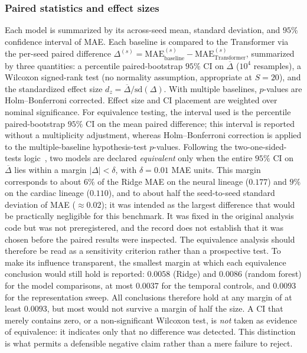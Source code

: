 \documentclass[pdflatex,sn-mathphys-num]{sn-jnl}
\theoremstyle{thmstyleone}%
\theoremstyle{thmstyletwo}%
\theoremstyle{thmstylethree}%
\begin{document}
\subsubsection{Paired statistics and effect sizes} Each model is summarized by its across-seed mean, standard deviation, and $95\%$ confidence interval of MAE. Each baseline is compared to the Transformer via the per-seed paired difference $\Delta^{(s)} = \mathrm{MAE}^{(s)}_{\text{baseline}} - \mathrm{MAE}^{(s)}_{\text{Transformer}}$, summarized by three quantities: a percentile paired-bootstrap $95\%$ CI on $\overline{\Delta}$ ($10^4$ resamples), a Wilcoxon signed-rank test (no normality assumption, appropriate at $S=20$), and the standardized effect size $d_z=\overline{\Delta}/\mathrm{sd}(\Delta)$. With multiple baselines, $p$-values are Holm--Bonferroni corrected. Effect size and CI placement are weighted over nominal significance. For equivalence testing, the interval used is the percentile paired-bootstrap $95\%$ CI on the mean paired difference; this interval is reported without a multiplicity adjustment, whereas Holm--Bonferroni correction is applied to the multiple-baseline hypothesis-test $p$-values. Following the two-one-sided-tests logic~\cite{lakens2017equivalence}, two models are declared \emph{equivalent} only when the entire $95\%$ CI on $\overline{\Delta}$ lies within a margin $|\Delta|<\delta$, with $\delta=0.01$ MAE units. This margin corresponds to about $6\%$ of the Ridge MAE on the neural lineage ($0.177$) and $9\%$ on the cardiac lineage ($0.110$), and to about half the seed-to-seed standard deviation of MAE ($\approx0.02$); it was intended as the largest difference that would be practically negligible for this benchmark. It was fixed in the original analysis code but was not preregistered, and the record does not establish that it was chosen before the paired results were inspected. The equivalence analysis should therefore be read as a sensitivity criterion rather than a prospective test. To make its influence transparent, the smallest margin at which each equivalence conclusion would still hold is reported: $0.0058$ (Ridge) and $0.0086$ (random forest) for the model comparisons, at most $0.0037$ for the temporal controls, and $0.0093$ for the representation sweep. All conclusions therefore hold at any margin of at least $0.0093$, but most would not survive a margin of half the size. A CI that merely contains zero, or a non-significant Wilcoxon test, is \emph{not} taken as evidence of equivalence: it indicates only that no difference was detected. This distinction is what permits a defensible negative claim rather than a mere failure to reject.
\end{document}
